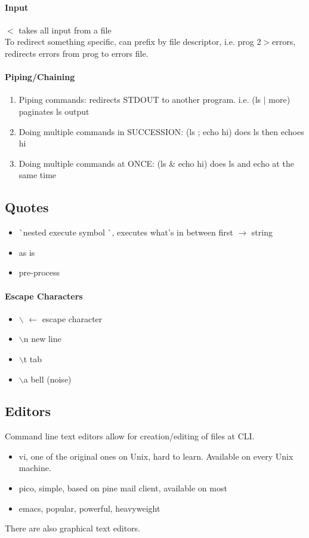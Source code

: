 \documentclass[12 pt]{article}
\begin{document}
	\paragraph{Input} $<$ takes all input from a file
	\\ To redirect something specific, can prefix by file descriptor, i.e. prog 2$>$errors, redirects errors from prog to errors file.
	\paragraph{Piping/Chaining}
	\begin{enumerate}[.]
		\item Piping commands: redirects STDOUT to another program. i.e. (ls $|$ more) paginates ls output
		\item Doing multiple commands in SUCCESSION: (ls ; echo hi) does ls then echoes hi
		\item Doing multiple commands at ONCE: (ls \& echo hi) does ls and echo at the same time
	\end{enumerate}
	\subsection{Quotes}
	\begin{itemize}
		\item \` \ nested execute symbol \`  \ , executes what's in between first $\to$ string
		\item \textquotesingle as is \textquotesingle 
		\item \textquotedbl pre-process \textquotedbl
		\end{itemize}
	\paragraph{Escape Characters}
	\begin{itemize}
		\item $\backslash$ $\gets$ escape character
		\item $\backslash$n new line
		\item $\backslash$t tab
		\item $\backslash$a bell (noise)
		\end{itemize}
	\subsection{Editors} Command line text editors allow for creation/editing of files at CLI. 
	\begin{itemize}
		\item vi, one of the original ones on Unix, hard to learn. Available on every Unix machine.
		\item pico, simple, based on pine mail client, available on most
		\item emacs, popular, powerful, heavyweight
	\end{itemize}
	There are also graphical text editors.
\end{document}
